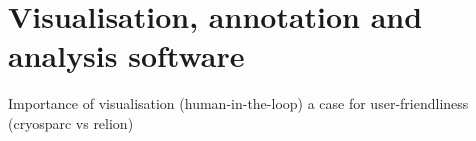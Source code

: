 \chapter{Visualisation, annotation and analysis software}

\begin{outline}
\1 Importance of visualisation (human-in-the-loop)
\1 a case for user-friendliness (cryosparc vs relion)
\end{outline}

